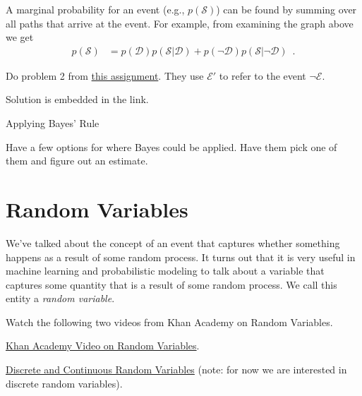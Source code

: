 \documentclass[assignment01_Solutions]{subfiles}
\begin{document}
A marginal probability for an event (e.g., $p(\mathcal{S})$) can be found by summing over all paths that arrive at the event.  For example, from examining the graph above we get
\begin{align}
p(\mathcal{S}) &= p(\mathcal{D}) p(\mathcal{S}|\mathcal{D}) + p(\neg \mathcal{D}) p(\mathcal{S}|\neg \mathcal{D})  \enspace .
\end{align}


\begin{exercise}[(20 minutes)]
Do problem 2 from \href{http://wwwf.imperial.ac.uk/~atw/Bayes.pdf}{this assignment}.  They use $\mathcal{E}'$ to refer to the event $\neg \mathcal{E}$.
\begin{boxedsolution}
Solution is embedded in the link.
\end{boxedsolution}
\end{exercise}

\begin{exercise}[(30 minutes)]
Applying Bayes' Rule
\end{exercise}

Have a few options for where Bayes could be applied.  Have them pick one of them and figure out an estimate.

\section{Random Variables}

We've talked about the concept of an event that captures whether something happens as a result of some random process.  It turns out that it is very useful in machine learning and probabilistic modeling to talk about a variable that captures some quantity that is a result of some random process.  We call this entity a \emph{random variable}.

\begin{externalresources}[(30 minutes)]
Watch the following two videos from Khan Academy on Random Variables.
\bi
\item \href{https://www.khanacademy.org/math/statistics-probability/random-variables-stats-library/random-variables-discrete/v/random-variables}{Khan Academy Video on Random Variables}.
\item \href{https://www.khanacademy.org/math/statistics-probability/random-variables-stats-library/random-variables-discrete/v/discrete-and-continuous-random-variables}{Discrete and Continuous Random Variables} (note: for now we are interested in discrete random variables).
\ei
\end{externalresources}
\end{document}

